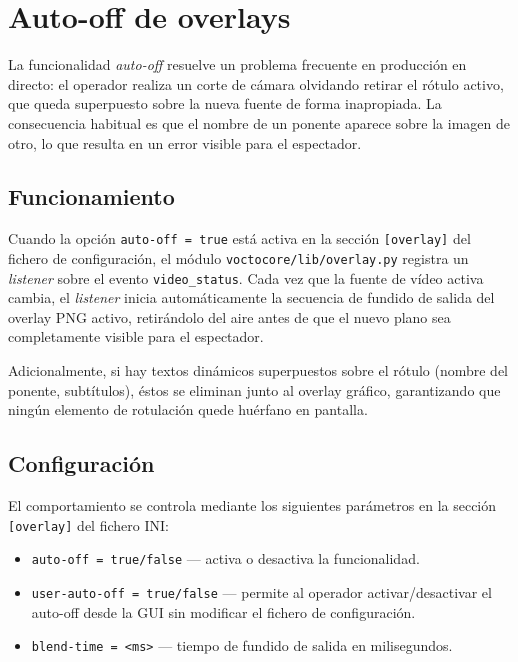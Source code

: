 \section{Auto-off de overlays}

La funcionalidad \textit{auto-off} resuelve un problema frecuente en producción en
directo: el operador realiza un corte de cámara olvidando retirar el rótulo activo,
que queda superpuesto sobre la nueva fuente de forma inapropiada. La consecuencia
habitual es que el nombre de un ponente aparece sobre la imagen de otro, lo que
resulta en un error visible para el espectador.

\subsection{Funcionamiento}

Cuando la opción \texttt{auto-off = true} está activa en la sección \texttt{[overlay]}
del fichero de configuración, el módulo \texttt{voctocore/lib/overlay.py} registra un
\textit{listener} sobre el evento \texttt{video\_status}. Cada vez que la fuente de
vídeo activa cambia, el \textit{listener} inicia automáticamente la secuencia de
fundido de salida del overlay PNG activo, retirándolo del aire antes de que el nuevo
plano sea completamente visible para el espectador.

Adicionalmente, si hay textos dinámicos superpuestos sobre el rótulo (nombre del
ponente, subtítulos), éstos se eliminan junto al overlay gráfico, garantizando que
ningún elemento de rotulación quede huérfano en pantalla.

\subsection{Configuración}

El comportamiento se controla mediante los siguientes parámetros en la sección
\texttt{[overlay]} del fichero INI:

\begin{itemize}
  \item \texttt{auto-off = true/false} --- activa o desactiva la funcionalidad.
  \item \texttt{user-auto-off = true/false} --- permite al operador activar/desactivar
        el auto-off desde la GUI sin modificar el fichero de configuración.
  \item \texttt{blend-time = <ms>} --- tiempo de fundido de salida en milisegundos.
\end{itemize}

